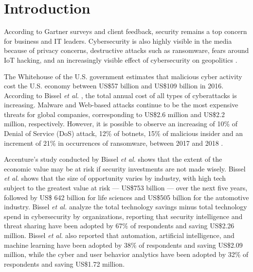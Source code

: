 \chapter{Introduction}
\label{ch:1_introduction}

According to Gartner surveys and client feedback, security remains a top concern for business and IT leaders. Cybersecurity is also highly visible in the media because of privacy concerns, destructive attacks such as ransomware, fears around IoT hacking, and an increasingly visible effect of cybersecurity on geopolitics \cite{Chuvakin2018}.

The Whitehouse of the U.S. government \cite{whitehouse2018} estimates that malicious cyber activity cost the U.S. economy between US\$57 billion and US\$109 billion in 2016. According to Bissel \emph{et al.} \cite{BISSELL2019}, the total annual cost of all types of cyberattacks is increasing. Malware and Web-based attacks continue to be the most expensive threats for global companies, corresponding to US\$2.6 million and US\$2.2 million, respectively. However, it is possible to observe an increasing of 10\% of Denial of Service (DoS) attack, 12\% of botnets, 15\% of malicious insider and an increment of 21\% in occurrences of ransomware, between 2017 and 2018 \cite{BISSELL2019}.

Accenture's study conducted by Bissel \emph{et al.} \cite{BISSELL2019} shows that the extent of the economic value may be at risk if security investments are not made wisely. Bissel \emph{et al.} \cite{BISSELL2019} shows that the size of opportunity varies by industry, with high tech subject to the greatest value at risk — US\$753 billion — over the next five years, followed by US\$ 642 billion for life sciences and US\$505 billion for the automotive industry. Bissel \emph{et al.} \cite{BISSELL2019} analyze the total technology savings minus total technology spend in cybersecurity by organizations, reporting that security intelligence and threat sharing have been adopted by 67\% of respondents and saving US\$2.26 million. Bissel \emph{et al.} \cite{BISSELL2019} also reported that automation, artificial intelligence, and machine learning have been adopted by 38\% of respondents and saving US\$2.09 million, while the cyber and user behavior analytics have been adopted by 32\% of respondents and saving US\$1.72 million.

